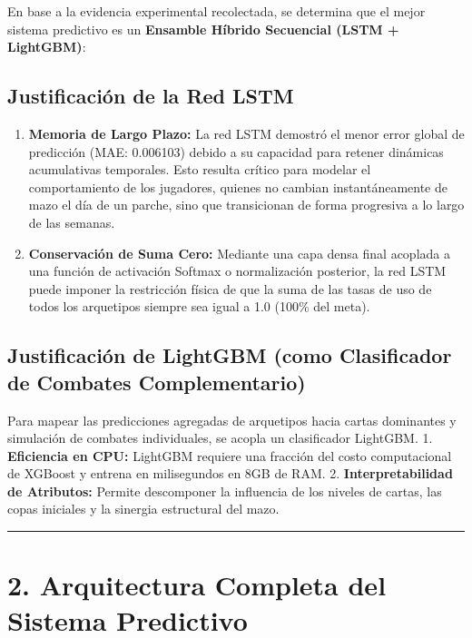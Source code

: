 \documentclass[
  spanish,
  12pt,
]{report}
\providecommand{\tightlist}{%
  \setlength{\itemsep}{0pt}\setlength{\parskip}{0pt}}
\begin{document}
En base a la evidencia experimental recolectada, se determina que el
mejor sistema predictivo es un \textbf{Ensamble Híbrido Secuencial (LSTM
+ LightGBM)}:

\subsection{Justificación de la Red
LSTM}\label{justificaciuxf3n-de-la-red-lstm}

\begin{enumerate}
\def\labelenumi{\arabic{enumi}.}
\tightlist
\item
  \textbf{Memoria de Largo Plazo:} La red LSTM demostró el menor error
  global de predicción (MAE: 0.006103) debido a su capacidad para
  retener dinámicas acumulativas temporales. Esto resulta crítico para
  modelar el comportamiento de los jugadores, quienes no cambian
  instantáneamente de mazo el día de un parche, sino que transicionan de
  forma progresiva a lo largo de las semanas.
\item
  \textbf{Conservación de Suma Cero:} Mediante una capa densa final
  acoplada a una función de activación Softmax o normalización
  posterior, la red LSTM puede imponer la restricción física de que la
  suma de las tasas de uso de todos los arquetipos siempre sea igual a
  1.0 (100\% del meta).
\end{enumerate}

\subsection{Justificación de LightGBM (como Clasificador de Combates
Complementario)}\label{justificaciuxf3n-de-lightgbm-como-clasificador-de-combates-complementario}

Para mapear las predicciones agregadas de arquetipos hacia cartas
dominantes y simulación de combates individuales, se acopla un
clasificador LightGBM. 1. \textbf{Eficiencia en CPU:} LightGBM requiere
una fracción del costo computacional de XGBoost y entrena en
milisegundos en 8GB de RAM. 2. \textbf{Interpretabilidad de Atributos:}
Permite descomponer la influencia de los niveles de cartas, las copas
iniciales y la sinergia estructural del mazo.

\begin{center}\rule{0.5\linewidth}{0.5pt}\end{center}

\section{2. Arquitectura Completa del Sistema
Predictivo}\label{arquitectura-completa-del-sistema-predictivo}
\end{document}
